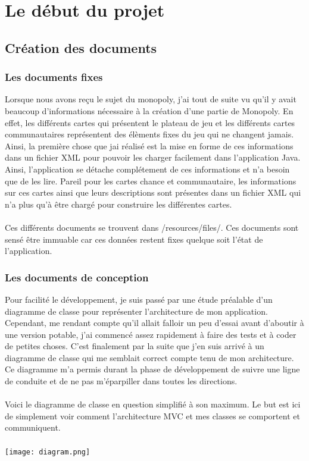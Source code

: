 \documentclass[12pt, openany]{report}
\begin{document}
\part{Le début du projet}
  \chapter{Création des documents}
    \section{Les documents fixes}
    Lorsque nous avons reçu le sujet du monopoly, j'ai tout de suite vu qu'il y avait beaucoup d'informations nécessaire à la création d'une partie de Monopoly. En effet, les différents cartes qui présentent le plateau de jeu et les différents cartes communautaires représentent des élèments fixes du jeu qui ne changent jamais. Ainsi, la première chose que jai réalisé est la mise en forme de ces informations dans un fichier XML pour pouvoir les charger facilement dans l'application Java. Ainsi, l'application se détache complétement de ces informations et n'a besoin que de les lire. Pareil pour les cartes chance et communautaire, les informations sur ces cartes ainsi que leurs descriptions sont présentes dans un fichier XML qui n'a plus qu'à être chargé pour construire les différentes cartes.\\\\
    Ces différents documents se trouvent dans /resources/files/. Ces documents sont sensé être immuable car ces données restent fixes quelque soit l'état de l'application.
    
    \section{Les documents de conception}
    Pour facilité le développement, je suis passé par une étude préalable d'un diagramme de classe pour représenter l'architecture de mon application. Cependant, me rendant compte qu'il allait falloir un peu d'essai avant d'aboutir à une version potable, j'ai commencé assez rapidement à faire des tests et à coder de petites choses. C'est finalement par la suite que j'en suis arrivé à un diagramme de classe qui me semblait correct compte tenu de mon architecture. Ce diagramme m'a permis durant la phase de développement de suivre une ligne de conduite et de ne pas m'éparpiller dans toutes les directions.\\\\
    Voici le diagramme de classe en question simplifié à son maximum. Le but est ici de simplement voir comment l'architecture MVC et mes classes se comportent et communiquent.\\\\
    \texttt{[image: diagram.png]}
\end{document}
